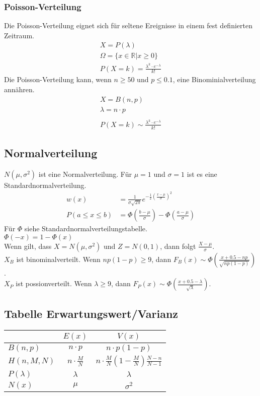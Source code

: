 \documentclass[a4paper, landscape, 10pt]{article}
\begin{document}
\begin{multicols}{5}
\begin{small}
		    \subsubsection{Poisson-Verteilung}
		    Die Poisson-Verteilung eignet sich für seltene Ereignisse in einem fest definierten Zeitraum.
			    \begin{align*}
			    X = P(\lambda)\\
			    \Omega = \{x \in \mathbb{R} | x \geq 0\}\\
			    P(X = k) = \frac{\lambda^k \cdot e^{-\lambda}}{k!}	
			    \end{align*}
		    Die Poisson-Verteilung kann, wenn $n \ge 50$ und $p \leq 0.1$, eine Binominialverteilung annähren.
			    \begin{align*}
			    X = B(n, p) \\
			    \lambda = n \cdot p \\\\
			    P(X = k) \sim \frac{\lambda^k \cdot e^{-\lambda}}{k!}	
			    \end{align*}
	    	\subsection{Normalverteilung}
	    	$N(\mu, \sigma^2)$ ist eine Normalverteilung. Für $\mu = 1$ und $\sigma = 1$ ist es eine Standardnormalverteilung.
	    	\begin{align*}
	    		w(x) &= \frac{1}{\sigma \sqrt{2 \pi}} e^{-\frac{1}{2}(\frac{x-\mu}{\sigma})^2}\\
	    		P(a\le x\le b)&= \Phi(\frac{b-\mu}{\sigma})-\Phi(\frac{a-\mu}{\sigma})
	    	\end{align*}
	    	Für $\Phi$ siehe Standardnormalverteilungstabelle.\\
	    	$\Phi(-x) = 1-\Phi(x)$\\
	    	
	    	Wenn gilt, dass $X = N(\mu, \sigma^2)$ und $Z = N(0,1)$, dann folgt $\frac{X - \mu}{\sigma}$. \\
	    	$X_B$ ist binominalverteilt. Wenn $np(1-p)\ge9$, dann $F_B(x) \sim \Phi\left(\frac{x + 0.5 - np}{\sqrt{np(1-p)}}\right)$. \\
	    	$X_P$ ist possionverteilt. Wenn $\lambda \ge 9$, dann $F_P(x) \sim \Phi\left(\frac{x + 0.5 - \lambda}{\sqrt{\lambda}}\right)$.
	    	
	    	\subsection{Tabelle Erwartungswert/Varianz}
	    	\begin{tabular}{l|c|c}
	    		&  $E(x)$ & $V(x)$\\ \hline
	    		$B(n,p)$ & $n\cdot p$ & $n\cdot p(1-p)$\\\hline
	    		$H(n,M,N)$ & $n\cdot\frac{M}{N}$ & $n\cdot\frac{M}{N}(1-\frac{M}{N})\frac{N-n}{N-1}$\\\hline
	    		$P(\lambda)$ & $\lambda$ & $\lambda$\\\hline
	    		$N(x)$ & $\mu$ & $\sigma^2$
	    	\end{tabular}
    	

\end{small}
\end{multicols}
\end{document}
